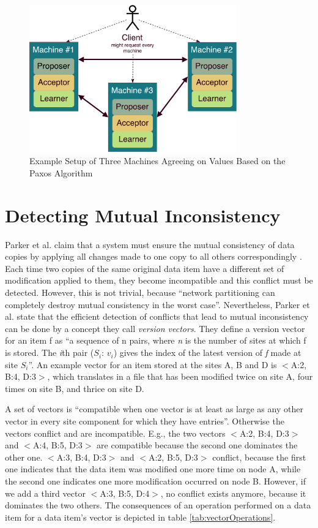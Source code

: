 \begin{figure}[ht]
    \centering
	\includegraphics[width=0.8\textwidth]{fig/PaxosSetup.pdf}
	\caption{Example Setup of Three Machines Agreeing on Values Based on the Paxos Algorithm}
	\label{fig:paxosSetup}
\end{figure}

\section{Detecting Mutual Inconsistency}
\label{sec:versionVector}

Parker et al. claim that a system must ensure the mutual consistency of data copies by applying all changes made to one copy to all others correspondingly \cite{versionVektor}.
Each time two copies of the same original data item have a different set of modification applied to them, they become incompatible and this conflict must be detected.
However, this is not trivial, because \enquote{network partitioning can completely destroy mutual consistency in the worst case}.
Nevertheless, Parker et al. state that the efficient detection of conflicts that lead to mutual inconsistency can be done by a concept they call \textit{version vectors}.
They define a version vector for an item f as \enquote{a sequence of n pairs, where \textit{n} is the number of sites at which f is stored. The \textit{i}th pair ($S_i$: $v_i$) gives the index of the latest version of \textit{f} made at site $S_i$}.
An example vector for an item stored at the sites A, B and D is $<$A:2, B:4, D:3$>$, which translates in a file that has been modified twice on site A, four times on site B, and thrice on site D.

A set of vectors is \enquote{compatible when one vector is at least as large as any other vector in every site component for which they have entries}.
Otherwise the vectors conflict and are incompatible.
E.g., the two vectors $<$A:2, B:4, D:3$>$ and $<$A:4, B:5, D:3$>$ are compatible because the second one dominates the other one.
$<$A:3, B:4, D:3$>$ and $<$A:2, B:5, D:3$>$ conflict, because the first one indicates that the data item was modified one more time on node A, while the second one indicates one more modification occurred on node B.
However, if we add a third vector $<$A:3, B:5, D:4$>$, no conflict exists anymore, because it dominates the two others.
The consequences of an operation performed on a data item for a data item's vector is depicted in table \ref{tab:vectorOperations}.

